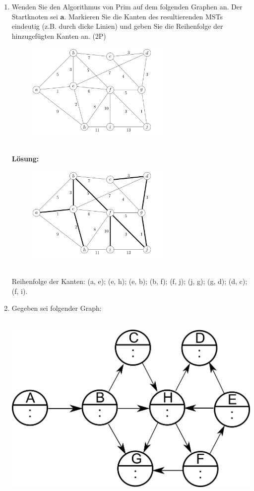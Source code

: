 \documentclass{scrartcl}
\begin{document}
\begin{enumerate}[(1)]
\item Wenden Sie den Algorithmus von Prim auf dem folgenden Graphen an. Der Startknoten sei \textbf{a}. Markieren Sie die Kanten des resultierenden MSTs eindeutig (z.B. durch dicke Linien) und geben Sie die Reihenfolge der hinzugefügten Kanten an. (2P)
\begin{figure}[h]
\centering
\includegraphics[width=0.66\textwidth]{mst_graph.png}
\end{figure}\\
\textbf{Lösung:}\\
\begin{figure}[h]
\centering
\includegraphics[width=0.66\textwidth]{images/mst_loes.png}
\end{figure}\\
Reihenfolge der Kanten: (a, e); (e, h); (e, b); (b, f); (f, j); (j, g); (g, d); (d, c); (f, i).
\pagebreak
\item Gegeben sei folgender Graph:\\
\ \\
\begin{center}
\includegraphics[width=0.75\linewidth]{images/tiefensuche_aufg}\\

\end{center}
\end{enumerate}
\end{document}
